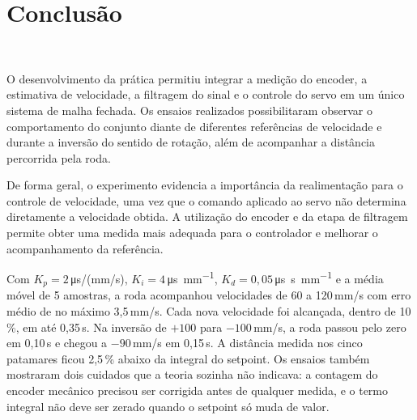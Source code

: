 \documentclass[12pt]{article}
\begin{document}
\section{Conclusão}\

O desenvolvimento da prática permitiu integrar a medição do encoder, a estimativa de velocidade, a filtragem do sinal e o controle do servo em um único sistema de malha fechada. Os ensaios realizados possibilitaram observar o comportamento do conjunto diante de diferentes referências de velocidade e durante a inversão do sentido de rotação, além de acompanhar a distância percorrida pela roda.

De forma geral, o experimento evidencia a importância da realimentação para o controle de velocidade, uma vez que o comando aplicado ao servo não determina diretamente a velocidade obtida. A utilização do encoder e da etapa de filtragem permite obter uma medida mais adequada para o controlador e melhorar o acompanhamento da referência.

Com $K_p = 2$\,\si{\micro\second}/(mm/s), $K_i = 4$\,\si{\micro\second\per\milli\meter}, $K_d = 0{,}05$\,\si{\micro\second\second\per\milli\meter} e a média móvel de 5 amostras, a roda acompanhou velocidades de 60 a 120\,mm/s com erro médio de no máximo 3,5\,mm/s. Cada nova velocidade foi alcançada, dentro de 10\,\%, em até 0,35\,s. Na inversão de $+100$ para $-100$\,mm/s, a roda passou pelo zero em 0,10\,s e chegou a $-90$\,mm/s em 0,15\,s. A distância medida nos cinco patamares ficou 2,5\,\% abaixo da integral do setpoint. Os ensaios também mostraram dois cuidados que a teoria sozinha não indicava: a contagem do encoder mecânico precisou ser corrigida antes de qualquer medida, e o termo integral não deve ser zerado quando o setpoint só muda de valor.




\end{document}
